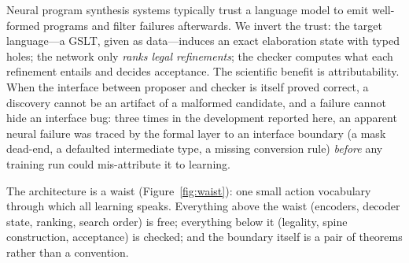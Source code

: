 \documentclass[11pt]{article}
\begin{document}
Neural program synthesis systems typically trust a language model to emit well-formed
programs and filter failures afterwards. We invert the trust: the target language---a
GSLT, given as data---induces an exact elaboration state with typed holes; the network
only \emph{ranks legal refinements}; the checker computes what each refinement entails
and decides acceptance. The scientific benefit is attributability. When the interface
between proposer and checker is itself proved correct, a discovery cannot be an artifact
of a malformed candidate, and a failure cannot hide an interface bug: three times in the
development reported here, an apparent neural failure was traced by the formal layer to
an interface boundary (a mask dead-end, a defaulted intermediate type, a missing
conversion rule) \emph{before} any training run could mis-attribute it to learning.

The architecture is a waist (Figure~\ref{fig:waist}): one small action vocabulary through
which all learning speaks. Everything above the waist (encoders, decoder state, ranking,
search order) is free; everything below it (legality, spine construction, acceptance) is
checked; and the boundary itself is a pair of theorems rather than a convention.
\end{document}
